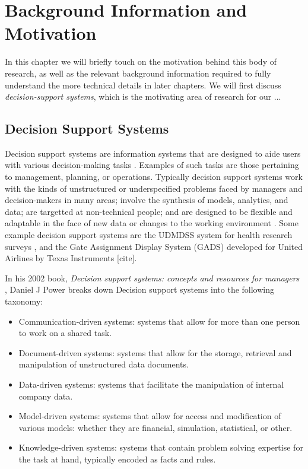 \documentclass[thesis.tex]{subfiles}
\begin{document}
\chapter{Background Information and Motivation}
\label{chap:background-information}

In this chapter we will briefly touch on the motivation behind this body of research,
as well as the relevant background information required to fully understand the more
technical details in later chapters. We will first discuss \emph{decision-support systems},
which is the motivating area of research for our ...








\section{Decision Support Systems}

Decision support systems are information systems that are designed to aide users with various
decision-making tasks \cite{sprague1980framework}. Examples of such tasks are those pertaining to management,
planning, or operations. Typically decision support systems work with the kinds of unstructured
or underspecified problems faced by managers and decision-makers in many areas; involve the
synthesis of models, analytics, and data; are targetted at non-technical people; and are designed
to be flexible and adaptable in the face of new data or changes to the working environment
\cite{sprague1980framework}. Some example decision support systems are the UDMDSS system
for health research surveys \cite{kent2010application},
and the Gate Assignment Display System (GADS) developed for United Airlines
by Texas Instruments [cite].

In his 2002 book, \emph{Decision support systems: concepts and resources for managers}
\cite{power2002decision}, Daniel J Power breaks down Decision support systems into the following
taxonomy:

\begin{itemize}
  \item Communication-driven systems: systems that allow for more than one person to work on a
    shared task.
  \item Document-driven systems: systems that allow for the storage, retrieval and manipulation
    of unstructured data documents.
  \item Data-driven systems: systems that facilitate the manipulation of internal company data.
  \item Model-driven systems: systems that allow for access and modification of various models:
    whether they are financial, simulation, statistical, or other.
  \item Knowledge-driven systems: systems that contain problem solving expertise for the task at
    hand, typically encoded as facts and rules.
\end{itemize}
\end{document}
